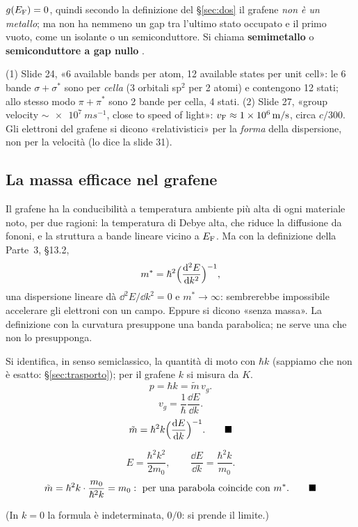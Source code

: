 \documentclass[11pt,a4paper]{article}
\begin{document}
\begin{chiave}
$g(E_{\mathrm F})=0$, quindi secondo la definizione del §\ref{sec:dos} il grafene \emph{non è un metallo}; ma non ha nemmeno un gap tra l'ultimo stato
occupato e il primo vuoto, come un isolante o un semiconduttore. Si chiama \textbf{semimetallo} o \textbf{semiconduttore a gap nullo}
.
\end{chiave}

\begin{osservazione}[slide 24 e 27]
(1) Slide 24, «6 available bands per atom, 12 available states per unit cell»: le 6 bande $\sigma+\sigma^*$ sono per \emph{cella} (3 orbitali sp$^2$
per 2 atomi) e contengono 12 stati; allo stesso modo $\pi+\pi^*$ sono 2 bande per cella, 4 stati. (2) Slide 27, «group velocity
$\sim\SI{e7}{ms^{-1}}$, close to speed of light»: $v_{\mathrm F}\approx\SI{1e6}{m/s}$, circa $c/300$. Gli elettroni del grafene si dicono «relativistici» per la
\emph{forma} della dispersione, non per la velocità (lo dice la slide 31).
\end{osservazione}

\subsection{La massa efficace nel grafene}\label{sec:massagrafene}
Il grafene ha la conducibilità a temperatura ambiente più alta di ogni materiale noto, per due ragioni: la temperatura di Debye alta, che riduce la
diffusione da fononi, e la struttura a bande lineare vicino a $E_{\mathrm F}$. Ma con la definizione della Parte~3, §13.2,
\[ m^*=\hbar^2\Bigl(\frac{\mathrm d^2E}{\mathrm d k^2}\Bigr)^{-1}, \]
una dispersione lineare dà $\dd^2E/\dd k^2=0$ e $m^*\to\infty$: sembrerebbe impossibile accelerare gli elettroni con un campo. Eppure si dicono
«senza massa». La definizione con la curvatura presuppone una banda parabolica; ne serve una che non lo presupponga.

\begin{dimostrazione}
Si identifica, in senso semiclassico, la quantità di moto con $\hbar k$ (sappiamo che non è esatto: §\ref{sec:trasporto}); per il grafene $k$ si misura da $K$.
\[ p=\hbar k=\tilde m\,v_g. \]
\[ v_g=\frac1\hbar\frac{\dd E}{\dd k}. \]
\[ \tilde m=\hbar^2k\Bigl(\frac{\dd E}{\dd k}\Bigr)^{-1}.\qed \]
\end{dimostrazione}
\begin{dimostrazione}
\[ E=\frac{\hbar^2k^2}{2m_0},\qquad\frac{\dd E}{\dd k}=\frac{\hbar^2k}{m_0}. \]
\[ \tilde m=\hbar^2k\cdot\frac{m_0}{\hbar^2k}=m_0:\ \text{per una parabola coincide con }m^*.\qed \]
\end{dimostrazione}
(In $k=0$ la formula è indeterminata, $0/0$: si prende il limite.)
\end{document}

